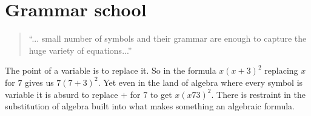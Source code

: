\chapter{Grammar school}

\begin{quote}
``... small number
of symbols and their grammar are enough to capture the huge
variety of equations...''
\end{quote}

The point of a variable is to replace it.  So in the formula 
$x(x+3)^2$ replacing $x$ for $7$ gives us $7(7+3)^2$.  
Yet even in the land of algebra where every symbol is variable it is absurd to
replace $+$ for $7$ to get $x(x73)^2$.   There is restraint in the substitution
of algebra built into what makes something an algebraic formula.


